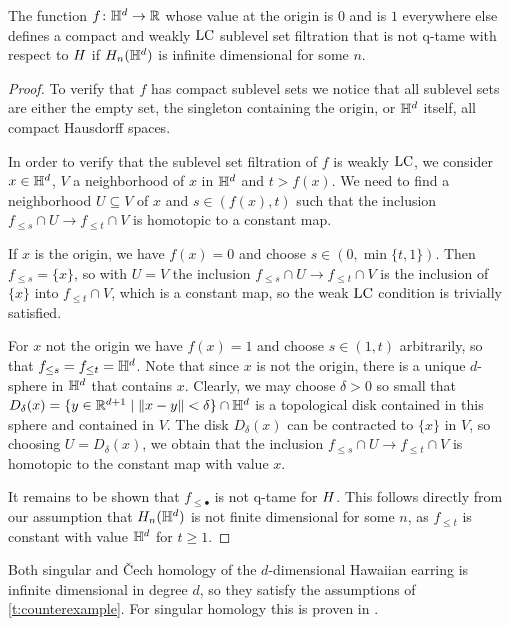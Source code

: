 \begin{thm} \label{t:counterexample}
	The function $f \colon \mathbb{H}^d \to \mathbb{R}$ whose value at the origin is $0$ and is $1$ everywhere else defines a compact and weakly $\mathrm{LC}$ sublevel set filtration that is not q-tame with respect to $H$ if $H_{n}(\mathbb{H}^d)$ is infinite dimensional for some $n$.
\end{thm}

\begin{proof}
	To verify that $f$ has compact sublevel sets we notice that all sublevel sets are either the empty set, the singleton containing the origin, or $\mathbb{H}^d$ itself, all compact Hausdorff spaces.
	
	In order to verify that the sublevel set filtration of $f$ is weakly $\mathrm{LC}$, we
	consider $x \in \mathbb{H}^d$, $V$ a neighborhood of $x$ in $\mathbb{H}^d$ and $t > f(x)$. We need to find a neighborhood $U \subseteq V$ of $x$ and $s \in (f(x), t)$ such that the inclusion $f_{\leq s} \cap U \to f_{\leq t} \cap V$ is homotopic to a constant map.
	
	If $x$ is the origin, we have $f(x) = 0$ and choose $s \in (0, \min\{t, 1\})$.
	Then $f_{\leq s} = \{x\}$, so with $U = V$ the inclusion $f_{\leq s} \cap U \to f_{\leq t} \cap V$ is the inclusion of $\{x\}$ into $f_{\leq t} \cap V$, which is a constant map, so the weak $\mathrm{LC}$ condition is trivially satisfied.
	
	For $x$ not the origin we have $f(x) = 1$ and choose $s \in (1,t)$ arbitrarily, so that $f_{\leq s} = f_{\leq t} = \mathbb{H}^d$. 
	Note that since $x$ is not the origin, there is a unique $d$-sphere in $\mathbb{H}^d$ that contains $x$.
	Clearly, we may choose $\delta > 0$ so small that $D_{\delta}(x) = \{y \in \mathbb{R}^{d+1} \mid \Vert x - y \Vert < \delta\} \cap \mathbb{H}^d$ is a topological disk contained in this sphere and contained in $V$. 
	The disk $D_\delta(x)$ can be contracted to $\{x\}$ in $V$, so choosing $U = D_{\delta}(x)$, we obtain that the inclusion $f_{\leq s} \cap U \to f_{\leq t} \cap V$ is homotopic to the constant map with value $x$.
	
	It remains to be shown that $f_{\leq \bullet}$ is not q-tame for $H$.
	This follows directly from our assumption that $H_{n}(\mathbb{H}^d)$ is not finite dimensional for some $n$, as $f_{\leq t}$ is constant with value $\mathbb{H}^d$ for $t \geq 1$.
\end{proof}
\newpage
Both singular and \v{C}ech homology of the $d$-dimensional Hawaiian earring is infinite dimensional in degree $d$, so they satisfy the assumptions of \cref{t:counterexample}.
For singular homology this is proven in \cite{Barratt.1962}.
